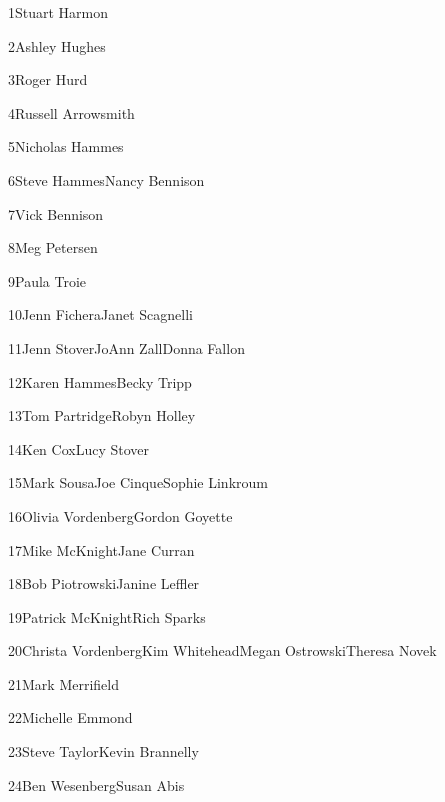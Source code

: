 \parbox[t]{4.75in}{1\hfil\break Stuart Harmon}\hfil\break\vskip 0.25in
\parbox[t]{4.75in}{2\hfil\break Ashley Hughes}\hfil\break\vskip 0.25in
\parbox[t]{4.75in}{3\hfil\break Roger Hurd}\hfil\break\vskip 0.25in
\parbox[t]{4.75in}{4\hfil\break Russell Arrowsmith}\hfil\break\vskip 0.25in
\parbox[t]{4.75in}{5\hfil\break Nicholas Hammes}\hfil\break\vskip 0.25in
\parbox[t]{4.75in}{6\hfil\break Steve Hammes\hfil\break Nancy Bennison}\hfil\break\vskip 0.25in
\parbox[t]{4.75in}{7\hfil\break Vick Bennison}\hfil\break\vskip 0.25in
\parbox[t]{4.75in}{8\hfil\break Meg Petersen}\hfil\break\vskip 0.25in
\parbox[t]{4.75in}{9\hfil\break Paula Troie}\hfil\break\vskip 0.25in
\parbox[t]{4.75in}{10\hfil\break Jenn Fichera\hfil\break Janet Scagnelli}\hfil\break\vskip 0.25in
\parbox[t]{4.75in}{11\hfil\break Jenn Stover\hfil\break JoAnn Zall\hfil\break Donna Fallon}\hfil\break\vskip 0.25in
\parbox[t]{4.75in}{12\hfil\break Karen Hammes\hfil\break Becky Tripp}\hfil\break\vskip 0.25in
\parbox[t]{4.75in}{13\hfil\break Tom Partridge\hfil\break Robyn Holley}\hfil\break\vskip 0.25in
\parbox[t]{4.75in}{14\hfil\break Ken Cox\hfil\break Lucy Stover}\hfil\break\vskip 0.25in
\parbox[t]{4.75in}{15\hfil\break Mark Sousa\hfil\break Joe Cinque\hfil\break Sophie Linkroum}\hfil\break\vskip 0.25in
\parbox[t]{4.75in}{16\hfil\break Olivia Vordenberg\hfil\break Gordon Goyette}\hfil\break\vskip 0.25in
\parbox[t]{4.75in}{17\hfil\break Mike McKnight\hfil\break Jane Curran}\hfil\break\vskip 0.25in
\parbox[t]{4.75in}{18\hfil\break Bob Piotrowski\hfil\break Janine Leffler}\hfil\break\vskip 0.25in
\parbox[t]{4.75in}{19\hfil\break Patrick McKnight\hfil\break Rich Sparks}\hfil\break\vskip 0.25in
\parbox[t]{4.75in}{20\hfil\break Christa Vordenberg\hfil\break Kim Whitehead\hfil\break Megan Ostrowski\hfil\break Theresa Novek}\hfil\break\vskip 0.25in
\parbox[t]{4.75in}{21\hfil\break Mark Merrifield}\hfil\break\vskip 0.25in
\parbox[t]{4.75in}{22\hfil\break Michelle Emmond}\hfil\break\vskip 0.25in
\parbox[t]{4.75in}{23\hfil\break Steve Taylor\hfil\break Kevin Brannelly}\hfil\break\vskip 0.25in
\parbox[t]{4.75in}{24\hfil\break Ben Wesenberg\hfil\break Susan Abis}\hfil\break\vskip 0.25in
